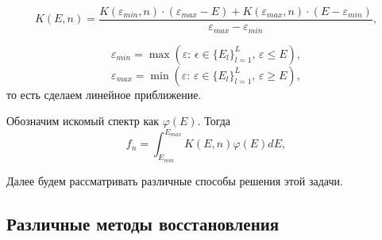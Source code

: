 \documentclass{config}
\begin{document}
\begin{equation}
    K(E, n) = \frac{K(\varepsilon_{min}, n) \cdot (\varepsilon_{max} - E) + K(\varepsilon_{max}, n) \cdot (E - \varepsilon_{min})}{\varepsilon_{max} - \varepsilon_{min}},
\end{equation}

\begin{equation}
    \varepsilon_{min} = \max(\varepsilon \text{: } \epsilon \in \{E_l\}_{l=1}^L \text{, } \varepsilon \leq E),
\end{equation}
\begin{equation}
    \varepsilon_{max} = \min(\varepsilon \text{: } \varepsilon \in \{E_l\}_{l=1}^L \text{, } \varepsilon \geq E),
\end{equation}
то есть сделаем линейное приближение.


Обозначим искомый спектр как $\varphi(E)$. Тогда
\begin{equation}
    f_n = \int_{E_{min}}^{E_{max}} K(E, n) \varphi(E) dE,
\end{equation}

Далее будем рассматривать различные способы решения этой задачи.

\subsection{Различные методы восстановления}
\end{document}
